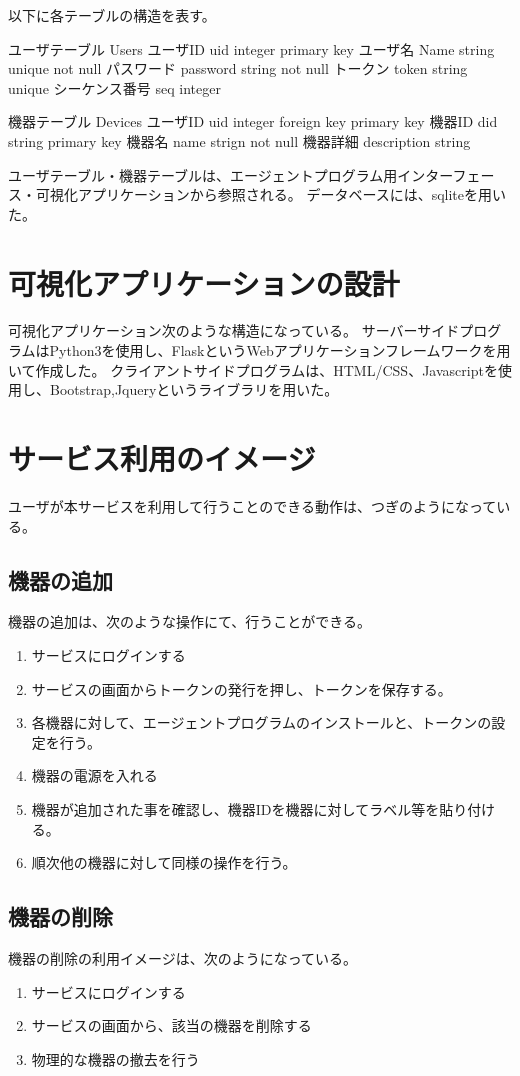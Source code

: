 以下に各テーブルの構造を表す。

ユーザテーブル Users
ユーザID uid integer primary key
ユーザ名 Name string unique not null
パスワード password string not null
トークン token string unique
シーケンス番号 seq integer

機器テーブル Devices
ユーザID uid integer foreign key primary key
機器ID did string primary key
機器名 name strign not null
機器詳細 description string

ユーザテーブル・機器テーブルは、エージェントプログラム用インターフェース・可視化アプリケーションから参照される。
データベースには、sqliteを用いた。


\section{可視化アプリケーションの設計}
可視化アプリケーション次のような構造になっている。
サーバーサイドプログラムはPython3を使用し、FlaskというWebアプリケーションフレームワークを用いて作成した。
クライアントサイドプログラムは、HTML/CSS、Javascriptを使用し、Bootstrap,Jqueryというライブラリを用いた。


\section{サービス利用のイメージ}
ユーザが本サービスを利用して行うことのできる動作は、つぎのようになっている。
\subsection{機器の追加}
機器の追加は、次のような操作にて、行うことができる。
\begin{enumerate}
\item サービスにログインする
\item サービスの画面からトークンの発行を押し、トークンを保存する。
\item 各機器に対して、エージェントプログラムのインストールと、トークンの設定を行う。
\item 機器の電源を入れる
\item 機器が追加された事を確認し、機器IDを機器に対してラベル等を貼り付ける。
\item 順次他の機器に対して同様の操作を行う。
\end{enumerate}

\subsection{機器の削除}
機器の削除の利用イメージは、次のようになっている。
\begin{enumerate}
\item サービスにログインする
\item サービスの画面から、該当の機器を削除する
\item 物理的な機器の撤去を行う
\end{enumerate}



